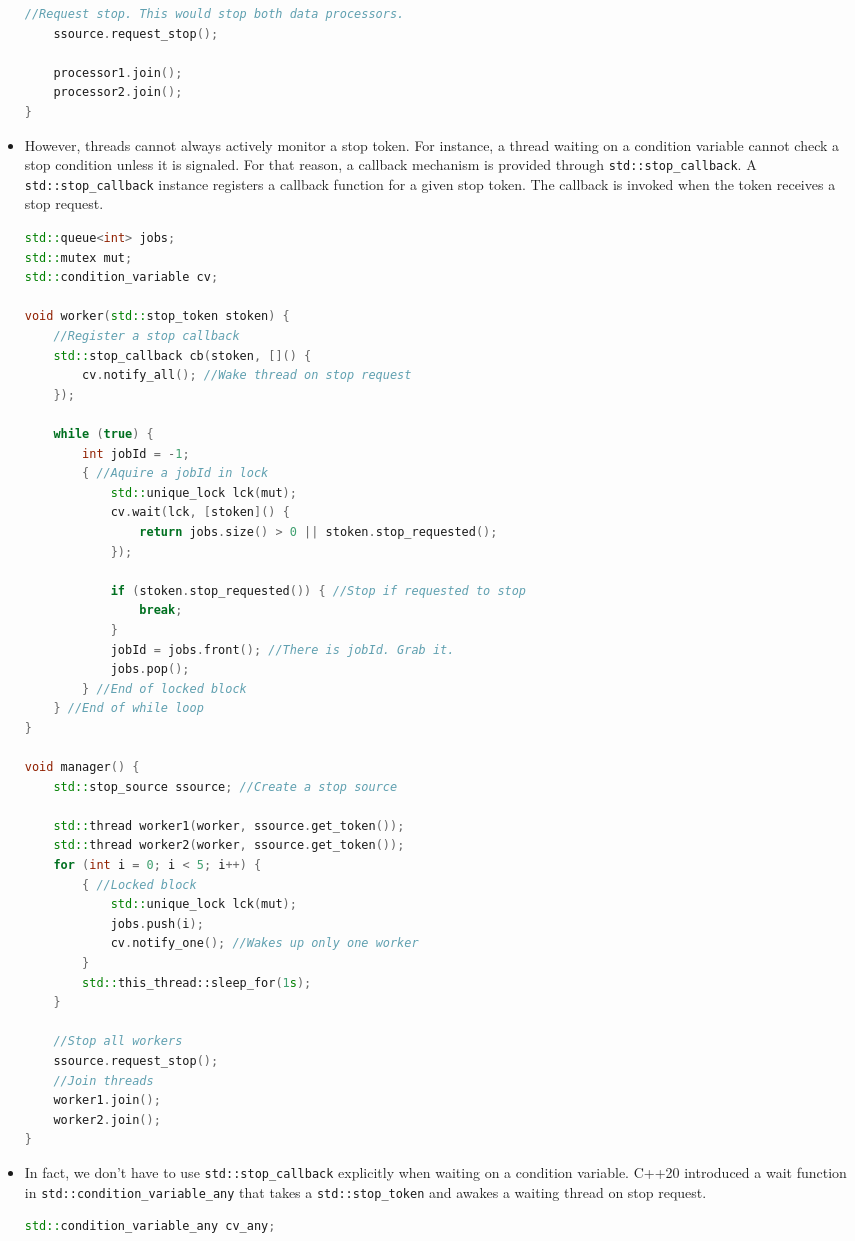 \documentclass[a4paper,11pt,twoside]{book}
\begin{document}
\begin{itemize}
\begin{lstlisting}[frame=single, language=c++]
	//Request stop. This would stop both data processors.
	ssource.request_stop();
	
	processor1.join();
	processor2.join();
}
\end{lstlisting}

\item However, threads cannot always actively monitor a stop token. For instance, a thread waiting on a condition variable cannot check a stop condition unless it is signaled. For that reason, a callback mechanism is provided through \texttt{std::stop\_callback}. A \texttt{std::stop\_callback} instance registers a callback function for a given stop token. The callback is invoked when the token receives a stop request.

\begin{lstlisting}[frame=single, language=c++]
std::queue<int> jobs;
std::mutex mut;
std::condition_variable cv;

void worker(std::stop_token stoken) {
	//Register a stop callback  
	std::stop_callback cb(stoken, []() {
		cv.notify_all(); //Wake thread on stop request
	});
	
	while (true) {
		int jobId = -1;
		{ //Aquire a jobId in lock
			std::unique_lock lck(mut);
			cv.wait(lck, [stoken]() {
				return jobs.size() > 0 || stoken.stop_requested();
			});
			
			if (stoken.stop_requested()) { //Stop if requested to stop
				break;
			}
			jobId = jobs.front(); //There is jobId. Grab it.
			jobs.pop();
		} //End of locked block
	} //End of while loop
}

void manager() {
	std::stop_source ssource; //Create a stop source
	
	std::thread worker1(worker, ssource.get_token());
	std::thread worker2(worker, ssource.get_token());
	for (int i = 0; i < 5; i++) {
		{ //Locked block
			std::unique_lock lck(mut);
			jobs.push(i);
			cv.notify_one(); //Wakes up only one worker
		}
		std::this_thread::sleep_for(1s);
	}
	
	//Stop all workers
	ssource.request_stop();
	//Join threads
	worker1.join();
	worker2.join();
}	
\end{lstlisting}


\item In fact, we don't have to use \texttt{std::stop\_callback} explicitly when waiting on a condition variable. C++20 introduced a wait function in \texttt{std::condition\_variable\_any} that takes a \texttt{std::stop\_token} and awakes a waiting thread on stop request. 
\begin{lstlisting}[frame=single, language=c++]	
std::condition_variable_any cv_any;


\end{lstlisting}
\end{itemize}
\end{document}
